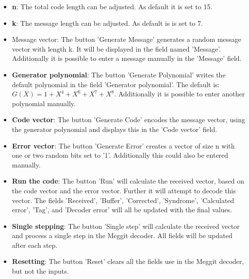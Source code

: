 \documentclass[MiniProjectMain]{subfiles}
\begin{document}
\begin{itemize}
\item \textbf{n}: The total code length can be adjusted. As default it is set to 15.

\item \textbf{k}: The message length can be adjusted. As default is is set to 7.

\item Message vector: The button 'Generate Message' generates a random message vector with length k. It will be displayed in the field named 'Message'. Additionally it is possible to enter a message manually in the 'Message' field.

\item \textbf{Generator polynomial}: The button 'Generate Polynomial' writes the default polynomial in the field 'Generator polynomial'. The default is: $G(X) = 1 + X^4 + X^6 + X^7 + X^8$. Additionally it is possible to enter another polynomial manually. 

\item \textbf{Code vector}: The button 'Generate Code' encodes the message vector, using the generator polynomial and displays this in the 'Code vector' field.

\item \textbf{Error vector}: The button 'Generate Error' creates a vector of size n with one or two random bits set to '1'. Additionally this could also be entered manually.

\item \textbf{Run the code}: The button 'Run' will calculate the received vector, based on the code vector and the error vector. Further it will attempt to decode this vector. The fields 'Received', 'Buffer', 'Corrected', 'Syndrome', 'Calculated error', 'Tag', and 'Decoder error' will all be updated with the final values.

\item \textbf{Single stepping}: The button 'Single step' will calculate the received vector and process a single step in the Meggit decoder. All fields will be updated after each step. 

\item \textbf{Resetting}: The button 'Reset' clears all the fields use in the Meggit decoder, but not the inputs.

\end{itemize}
\end{document}
